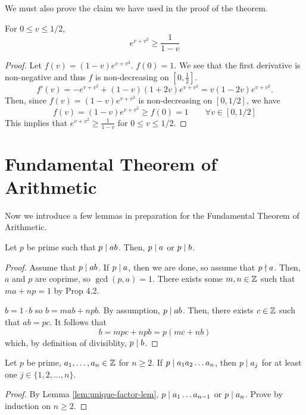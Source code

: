 We must also prove the claim we have used in the proof of the theorem.

\begin{lemma}
    For $0 \leq v \leq 1/2$,
    $$
    e^{v+v^2} \geq \frac{1}{1-v}
    $$
\end{lemma}
\begin{proof}
    Let $f(v) = (1-v) e^{v + v^2}$. $f(0)= 1$. We see that the first derivative is non-negative and thus $f$ is non-decreasing on $[0,\frac{1}{2}]$.
    $$
    f'(v) = -e^{v+v^2} + (1-v)(1+2v)e^{v+v^2} = v(1-2v)e^{v+v^2}.
    $$
    Then, since $f(v) = (1-v) e^{v+v^2}$ is non-decreasing on $[0,1/2]$, we have
    $$
    f(v) = (1-v) e^{v+v^2} \geq f(0) = 1 \qquad \forall v \in [0,1/2]
    $$
    This implies that $e^{v+v^2} \geq \frac{1}{1-v}$ for $0 \leq v \leq 1/2$.
\end{proof}

\section{Fundamental Theorem of Arithmetic}

Now we introduce a few lemmas in preparation for the Fundamental Theorem of Arithmetic.

\begin{lemma} \label{lem:unique-factor-lem}
    Let $p$ be prime such that $p \mathrel{\mid} ab$. Then, $p \mathrel{\mid} a$ or $p \mathrel{\mid} b$.
\end{lemma}

\begin{proof}
    Assume that $p \mathrel{\mid} ab$. If $p \mathrel{\mid} a$, then we are done, so assume that $p \mathrel{\nmid} a$. Then, $a$ and $p$ are coprime, so $\gcd(p,a) = 1$. There exists some $m,n \in \mathbb{Z}$ such that $ma + np = 1$ by Prop 4.2.

    $b = 1 \cdot b$ so $b = mab + npb$. By assumption, $p \mathrel{\mid} ab$. Then, there exists $c \in \mathbb{Z}$ such that $ab = pc$. It follows that
    $$
    b = mpc + npb = p(mc+nb)
    $$
    which, by definition of divisiblity, $p \mathrel{\mid} b$.
\end{proof}

\begin{corollary} \label{cor:fta-cor}
    Let $p$ be prime, $a_1,\ldots,a_n \in \mathbb{Z}$ for $n \geq 2$. If $p \mathrel{\mid} a_1a_2\ldots a_n$, then $p \mathrel{\mid} a_j$ for at least one $j \in \{1,2,\ldots,n\}$.
\end{corollary}

\begin{proof}
    By Lemma \ref{lem:unique-factor-lem}, $p \mathrel{\mid} a_1\ldots a_{n-1}$ or $p \mathrel{\mid} a_n$. Prove by induction on $n \geq 2$.
\end{proof}


